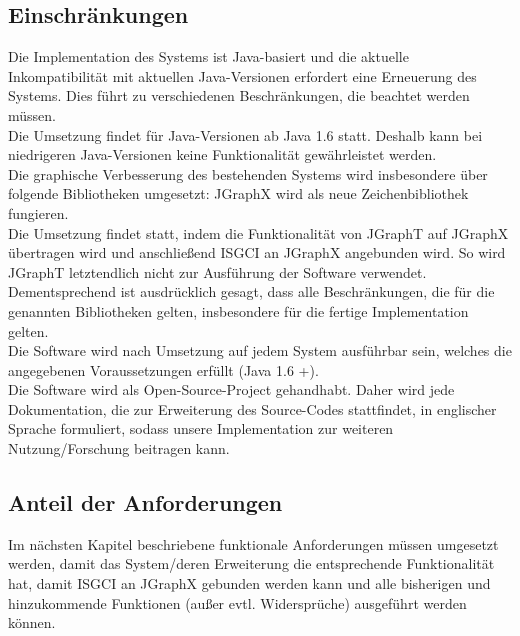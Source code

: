 \documentclass[11pt,a4paper]{article}
\begin{document}
	\subsection{Einschränkungen} %
	Die Implementation des Systems ist Java-basiert und die aktuelle Inkompatibilität mit aktuellen Java-Versionen erfordert eine Erneuerung des Systems. Dies führt zu verschiedenen Beschränkungen, die beachtet werden müssen.\\
	Die Umsetzung findet für Java-Versionen ab Java 1.6 statt. Deshalb kann bei niedrigeren Java-Versionen keine Funktionalität gewährleistet werden.\\
	Die graphische Verbesserung des bestehenden Systems wird insbesondere über folgende Bibliotheken umgesetzt:
	JGraphX wird als neue Zeichenbibliothek fungieren.\\
	Die Umsetzung findet statt, indem die Funktionalität von JGraphT auf JGraphX übertragen wird und anschließend ISGCI an JGraphX angebunden wird. So wird JGraphT letztendlich nicht zur Ausführung der Software verwendet.\\ %
	Dementsprechend ist ausdrücklich gesagt, dass alle Beschränkungen, die für die genannten Bibliotheken gelten, insbesondere für die fertige Implementation gelten.\\
	Die Software wird nach Umsetzung auf jedem System ausführbar sein, welches die angegebenen Voraussetzungen erfüllt (Java 1.6 +).\\
	Die Software wird als Open-Source-Project %
gehandhabt. Daher wird jede Dokumentation, die zur Erweiterung des Source-Codes stattfindet, in englischer Sprache formuliert, sodass unsere Implementation zur weiteren Nutzung/Forschung beitragen kann. 
	\subsection{Anteil der Anforderungen} %
	Im nächsten Kapitel beschriebene funktionale Anforderungen müssen umgesetzt werden, damit das System/deren Erweiterung die entsprechende Funktionalität hat, damit ISGCI an JGraphX gebunden werden kann und alle bisherigen und hinzukommende Funktionen (außer evtl. Widersprüche) ausgeführt werden können.
\newpage
\end{document}
